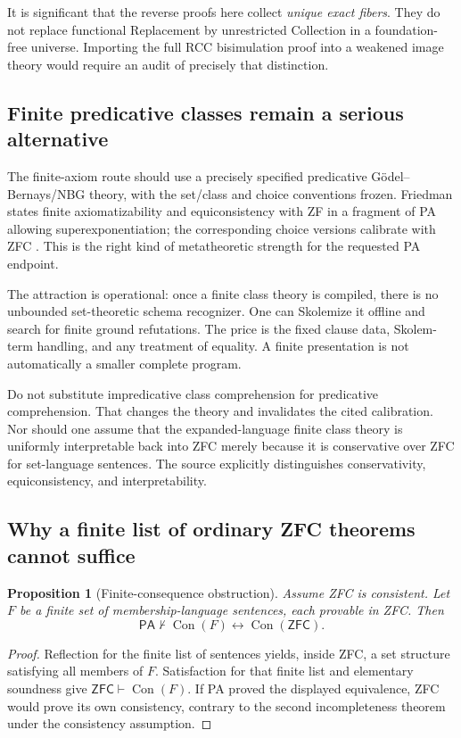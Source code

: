 \documentclass[11pt,letterpaper]{article}
\newtheorem{proposition}[theorem]{Proposition}
\theoremstyle{definition}\newtheorem{definition}[theorem]{Definition}
\theoremstyle{remark}\newtheorem{remark}[theorem]{Remark}
\newcommand{\PA}{\mathsf{PA}}
\newcommand{\ZFC}{\mathsf{ZFC}}
\newcommand{\Con}{\operatorname{Con}}
\begin{document}
It is significant that the reverse proofs here collect \emph{unique exact
fibers}. They do not replace functional Replacement by unrestricted
Collection in a foundation-free universe. Importing the full RCC
bisimulation proof into a weakened image theory would require an audit
of precisely that distinction.

\subsection{Finite predicative classes remain a serious alternative}

The finite-axiom route should use a precisely specified predicative
G\"odel--Bernays/NBG theory, with the set/class and choice conventions
frozen. Friedman states finite axiomatizability and equiconsistency with
ZF in a fragment of PA allowing superexponentiation; the corresponding
choice versions calibrate with ZFC \cite[p.~28]{friedman}.
This is the right kind of metatheoretic strength for the requested PA
endpoint.

The attraction is operational: once a finite class theory is compiled,
there is no unbounded set-theoretic schema recognizer. One can Skolemize
it offline and search for finite ground refutations. The price is the
fixed clause data, Skolem-term handling, and any treatment of equality.
A finite presentation is not automatically a smaller complete program.

Do not substitute impredicative class comprehension for predicative
comprehension. That changes the theory and invalidates the cited
calibration. Nor should one assume that the expanded-language finite
class theory is uniformly interpretable back into ZFC merely because it
is conservative over ZFC for set-language sentences. The source explicitly
distinguishes conservativity, equiconsistency, and interpretability.

\subsection{Why a finite list of ordinary ZFC theorems cannot suffice}

\begin{proposition}[Finite-consequence obstruction]\label{prop:finite}
Assume ZFC is consistent. Let $F$ be a finite set of membership-language
sentences, each provable in ZFC. Then
\[
 \PA\not\vdash\Con(F)\leftrightarrow\Con(\ZFC).
\]
\end{proposition}
\begin{proof}
Reflection for the finite list of sentences yields, inside ZFC, a set
structure satisfying all members of $F$. Satisfaction for that finite
list and elementary soundness give $\ZFC\vdash\Con(F)$.
If PA proved the displayed equivalence, ZFC would prove its own
consistency, contrary to the second incompleteness theorem under the
consistency assumption.
\end{proof}
\end{document}
